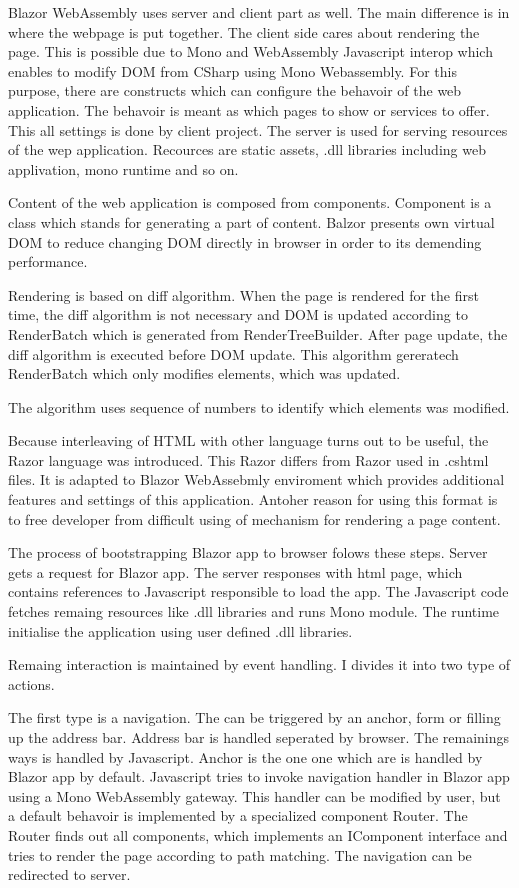 Blazor WebAssembly uses server and client part as well.
The main difference is in where the webpage is put together.
The client side cares about rendering the page.
This is possible due to Mono and WebAssembly Javascript interop which enables to modify DOM from CSharp using Mono Webassembly.
For this purpose, there are constructs which can configure the behavoir of the web application.
The behavoir is meant as which pages to show or services to offer.
This all settings is done by client project.
The server is used for serving resources of the wep application.
Recources are static assets, .dll libraries including web applivation, mono runtime and so on.

Content of the web application is composed from components.
Component is a class which stands for generating a part of content.
Balzor presents own virtual DOM to reduce changing DOM directly in browser in order to its demending performance.

Rendering is based on diff algorithm.
When the page is rendered for the first time, the diff algorithm is not necessary and DOM is updated according to RenderBatch which is generated from RenderTreeBuilder.
After page update, the diff algorithm is executed before DOM update. This algorithm gereratech RenderBatch which only modifies elements, which was updated.

The algorithm uses sequence of numbers to identify which elements was modified.


Because interleaving of HTML with other language turns out to be useful, the Razor language was introduced.
This Razor differs from Razor used in .cshtml files.
It is adapted to Blazor WebAssebmly enviroment which provides additional features and settings of this application.
Antoher reason for using this format is to free developer from difficult using of mechanism for rendering a page content.

The process of bootstrapping Blazor app to browser folows these steps. 
Server gets a request for Blazor app. 
The server responses with html page, which contains references to Javascript responsible to load the app. The Javascript code fetches remaing resources like .dll libraries and runs Mono module. 
The runtime initialise the application using user defined .dll libraries.

Remaing interaction is maintained by event handling.
I divides it into two type of actions.

The first type is a navigation.
The \cite{navigation} can be triggered by an anchor, form or filling up the address bar.
Address bar is handled seperated by browser.
The remainings ways is handled by Javascript.
Anchor is the one one which are is handled by Blazor app by default.
Javascript tries to invoke navigation handler in Blazor app using a Mono WebAssembly gateway.
This handler can be modified by user, but a default behavoir is implemented by a specialized component Router.
The Router finds out all components, which implements an IComponent interface and tries to render the page according to path matching.
The navigation can be redirected to server.

